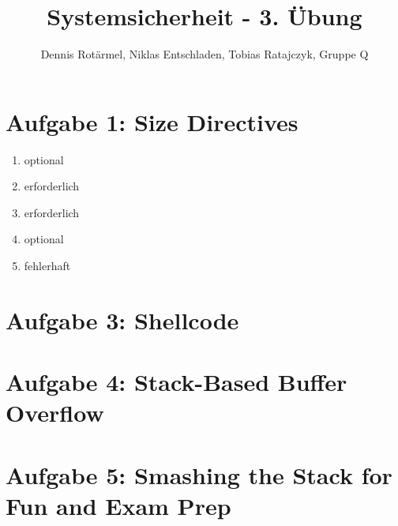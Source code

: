 \documentclass[]{scrreprt}
\title{Systemsicherheit - 3. Übung}
\author{Dennis Rotärmel, Niklas Entschladen, Tobias Ratajczyk, Gruppe Q}
\begin{document}
\maketitle
\pagebreak
\section*{Aufgabe 1: Size Directives}

\renewcommand{\labelenumi}{\alph{enumi})}
\begin{enumerate}
	\item optional
	\item erforderlich
	\item erforderlich
	\item optional
	\item fehlerhaft
\end{enumerate}
\section*{Aufgabe 3: Shellcode}
\section*{Aufgabe 4: Stack-Based Buffer Overflow}
\section*{Aufgabe 5:  Smashing the Stack for Fun and Exam Prep}
	
\end{document}
